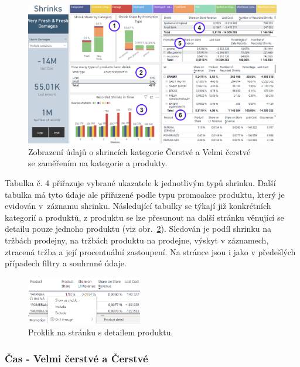 \begin{figure}[h!]
    \centering
    \captionsetup{justification=centering}
    \includegraphics[width=\textwidth]{obrazky/PBI/levelsSFF.png}
    \caption{Zobrazení údajů o shrincích kategorie Čerstvé a Velmi čerstvé \\ se zaměřením na kategorie a produkty.}
    \label{obr:PBI:storesSFF}
\end{figure}

Tabulka č. 4 přiřazuje vybrané ukazatele k jednotlivým typů shrinku. Další tabulka má tyto údaje ale přiřazené podle typu promoakce produktu, který je evidován v~záznamu shrinku. Následující tabulky se týkají již konkrétních kategorií a produktů, z produktu se lze přesunout na další stránku věnující se detailu pouze jednoho produktu (viz obr.~\ref*{obr:PBI:drilldetail}). Sledován je podíl shrinku na tržbách prodejny, na tržbách produktu na prodejne, výskyt v záznamech, ztracená tržba a její procentuální zastoupení. Na stránce jsou i jako v předešlých případech filtry a souhrnné údaje.

\begin{figure}[h!]
    \centering
    \captionsetup{justification=centering}
    \includegraphics[width=0.45\textwidth]{obrazky/PBI/detaildrill.png}
    \caption{Proklik na stránku s detailem produktu.}
    \label{obr:PBI:drilldetail}
\end{figure}

\subsubsection*{Čas - Velmi čerstvé a Čerstvé}

